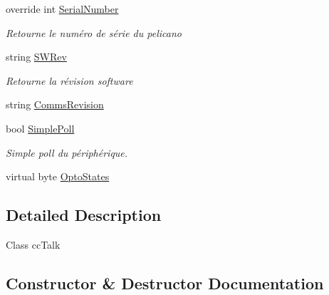 \begin{DoxyCompactItemize}
override int \mbox{\hyperlink{class_device_library_1_1_ccc_talk_a6b615dcccbe32e3c9166b0fdb0a74236}{Serial\+Number}}
\begin{DoxyCompactList}\small\item\em Retourne le numéro de série du pelicano \end{DoxyCompactList}\item 
string \mbox{\hyperlink{class_device_library_1_1_ccc_talk_a687a695bef6d7f25f8fe7148948d04bc}{S\+W\+Rev}}
\begin{DoxyCompactList}\small\item\em Retourne la révision software \end{DoxyCompactList}\item 
string \mbox{\hyperlink{class_device_library_1_1_ccc_talk_af78c9d598eaebc02a257d52353ab257c}{Comms\+Revision}}
\item 
bool \mbox{\hyperlink{class_device_library_1_1_ccc_talk_a576e09f74dc509dcd7919eceae9cc7de}{Simple\+Poll}}
\begin{DoxyCompactList}\small\item\em Simple poll du périphérique. \end{DoxyCompactList}\item 
virtual byte \mbox{\hyperlink{class_device_library_1_1_ccc_talk_a4ea55bd396398405345e50cb699c0ead}{Opto\+States}}
\end{DoxyCompactItemize}


\subsection{Detailed Description}
Class cc\+Talk 



\subsection{Constructor \& Destructor Documentation}
\mbox{\label{class_device_library_1_1_ccc_talk_acb6f8e8dcdfa88d9cdc5b3ebf1ea0e90}} 
